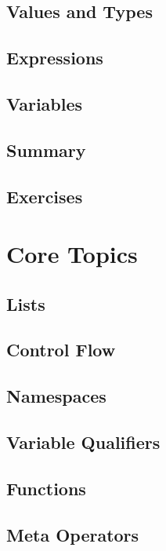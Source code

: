 \documentclass[oneside]{book}
\begin{document}
\section{Values and Types}
\blindtext

\section{Expressions}
\blindtext

\section{Variables}
\blindtext

\section{Summary}
\blindtext

\section{Exercises}
\blindtext

\chapter{Core Topics}
\blindtext

\section{Lists}

\section{Control Flow}
\blindtext

\section{Namespaces}
\blindtext

\section{Variable Qualifiers}
\blindtext

\section{Functions}
\blindtext

\section{Meta Operators}
\blindtext
\end{document}
